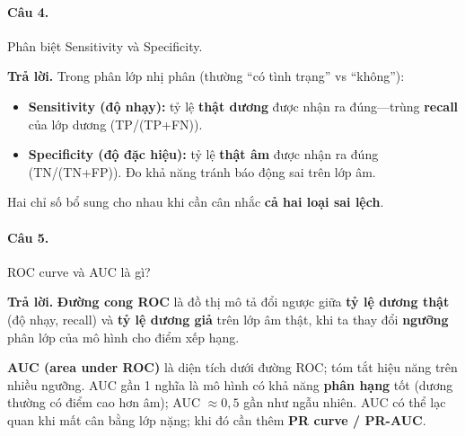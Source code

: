 \paragraph{Câu 4.} Phân biệt Sensitivity và Specificity.

\medskip\noindent\textbf{Trả lời.} Trong phân lớp nhị phân (thường ``có tình trạng'' vs ``không''):
\begin{itemize}[nosep]
\item \textbf{Sensitivity (độ nhạy):} tỷ lệ \textbf{thật dương} được nhận ra đúng---trùng \textbf{recall} của lớp dương (TP/(TP+FN)).
\item \textbf{Specificity (độ đặc hiệu):} tỷ lệ \textbf{thật âm} được nhận ra đúng (TN/(TN+FP)). Đo khả năng tránh báo động sai trên lớp âm.
\end{itemize}
Hai chỉ số bổ sung cho nhau khi cần cân nhắc \textbf{cả hai loại sai lệch}.

\paragraph{Câu 5.} ROC curve và AUC là gì?

\medskip\noindent\textbf{Trả lời.} \textbf{Đường cong ROC} là đồ thị mô tả đổi ngược giữa \textbf{tỷ lệ dương thật} (độ nhạy, recall) và \textbf{tỷ lệ dương giả} trên lớp âm thật, khi ta thay đổi \textbf{ngưỡng} phân lớp của mô hình cho điểm xếp hạng.

\textbf{AUC (area under ROC)} là diện tích dưới đường ROC; tóm tắt hiệu năng trên nhiều ngưỡng. AUC gần 1 nghĩa là mô hình có khả năng \textbf{phân hạng} tốt (dương thường có điểm cao hơn âm); AUC $\approx 0{,}5$ gần như ngẫu nhiên. AUC có thể lạc quan khi mất cân bằng lớp nặng; khi đó cần thêm \textbf{PR curve / PR-AUC}.

